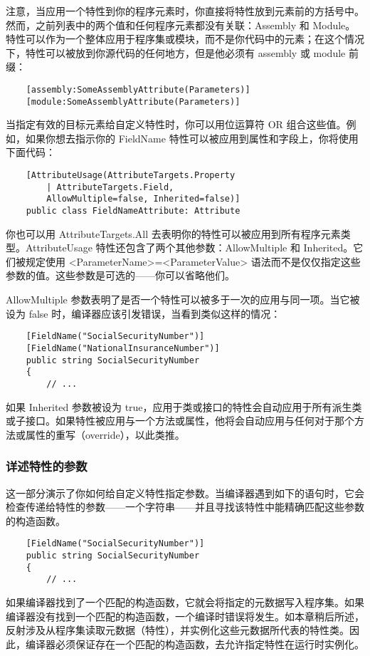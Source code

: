 注意，当应用一个特性到你的程序元素时，你直接将特性放到元素前的方括号中。然而，之前列表中的两个值和任何程序元素都没有关联：Assembly 和 Module。特性可以作为一个整体应用于程序集或模块，而不是你代码中的元素；在这个情况下，特性可以被放到你源代码的任何地方，但是他必须有 assembly 或 module 前缀：
\begin{verbatim}
    [assembly:SomeAssemblyAttribute(Parameters)]
    [module:SomeAssemblyAttribute(Parameters)]
\end{verbatim}
当指定有效的目标元素给自定义特性时，你可以用位运算符 OR 组合这些值。例如，如果你想去指示你的 FieldName 特性可以被应用到属性和字段上，你将使用下面代码：
\begin{verbatim}
    [AttributeUsage(AttributeTargets.Property
        | AttributeTargets.Field,
        AllowMultiple=false, Inherited=false)]
    public class FieldNameAttribute: Attribute
\end{verbatim}
你也可以用 AttributeTargets.All 去表明你的特性可以被应用到所有程序元素类型。AttributeUsage 特性还包含了两个其他参数：AllowMultiple 和 Inherited。它们被规定使用 <ParameterName>=<ParameterValue> 语法而不是仅仅指定这些参数的值。这些参数是可选的——你可以省略他们。

AllowMultiple 参数表明了是否一个特性可以被多于一次的应用与同一项。当它被设为 false 时，编译器应该引发错误，当看到类似这样的情况：
\begin{verbatim}
    [FieldName("SocialSecurityNumber")]
    [FieldName("NationalInsuranceNumber")]
    public string SocialSecurityNumber
    {
        // ...
\end{verbatim}
如果 Inherited 参数被设为 true，应用于类或接口的特性会自动应用于所有派生类或子接口。如果特性被应用与一个方法或属性，他将会自动应用与任何对于那个方法或属性的重写（override），以此类推。

\subsubsection{详述特性的参数}
这一部分演示了你如何给自定义特性指定参数。当编译器遇到如下的语句时，它会检查传递给特性的参数——一个字符串——并且寻找该特性中能精确匹配这些参数的构造函数。
\begin{verbatim}
    [FieldName("SocialSecurityNumber")]
    public string SocialSecurityNumber
    {
        // ...
\end{verbatim}
如果编译器找到了一个匹配的构造函数，它就会将指定的元数据写入程序集。如果编译器没有找到一个匹配的构造函数，一个编译时错误将发生。如本章稍后所述，反射涉及从程序集读取元数据（特性），并实例化这些元数据所代表的特性类。因此，编译器必须保证存在一个匹配的构造函数，去允许指定特性在运行时实例化。

